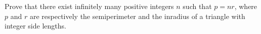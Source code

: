 Prove that there exist infinitely many positive integers $n$ such that $p = nr$, where $p$ and $r$ are respectively the semiperimeter and the inradius of a triangle with integer side lengths.
